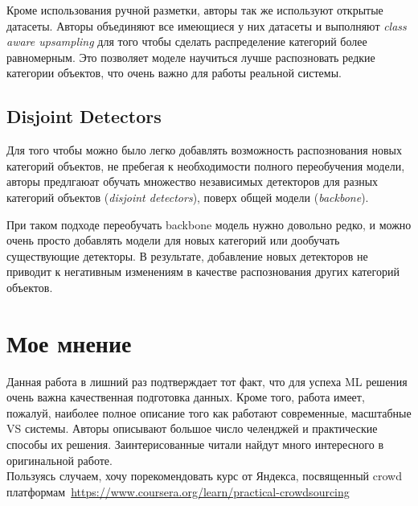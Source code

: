 Кроме использования ручной разметки, авторы так же используют открытые датасеты.
Авторы объединяют все имеющиеся у них датасеты и выполняют \textit{class aware upsampling} для того чтобы сделать распределение категорий более равномерным. 
Это позволяет моделе научиться лучше распозновать редкие категории объектов, что очень важно для работы реальной системы.

\subsection*{Disjoint Detectors}

Для того чтобы можно было легко добавлять возможность распознования новых категорий объектов, не пребегая к необходимости полного переобучения модели, авторы предлгаюат обучать множество независимых детекторов для разных категорий объектов (\textit{disjoint detectors}), поверх общей модели (\textit{backbone}).

При таком подходе переобучать backbone модель нужно довольно редко, и можно очень просто добавлять модели для новых категорий или дообучать существующие детекторы. 
В результате, добавление новых детекторов не приводит к негативным изменениям в качестве распознования других категорий объектов.

\section*{Мое мнение}

Данная работа в лишний раз подтверждает тот факт, что для успеха ML решения очень важна качественная подготовка данных.
Кроме того, работа имеет, пожалуй, наиболее полное описание того как работают современные, масштабные VS системы.
Авторы описывают большое число челенджей и практические способы их решения.
Заинтерисованные читали найдут много интересного в оригинальной работе. \\

Пользуясь случаем, хочу порекомендовать курс от Яндекса, посвященный crowd платформам~\url{https://www.coursera.org/learn/practical-crowdsourcing}
